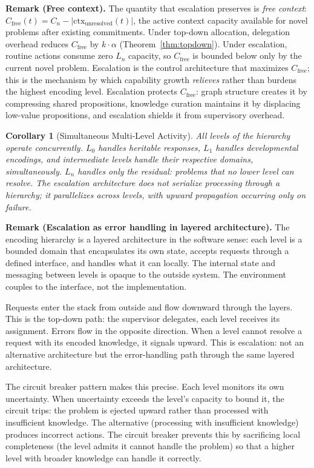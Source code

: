 \documentclass[11pt]{article}
\newtheorem{corollary}[theorem]{Corollary}
\theoremstyle{definition}
\begin{document}
\textbf{Remark (Free context).}
The quantity that escalation preserves is \emph{free context}:
$C_{\mathrm{free}}(t) = C_n -
|\mathrm{ctx}_{\mathrm{unresolved}}(t)|$, the active context capacity
available for novel problems after existing commitments. Under
top-down allocation, delegation overhead reduces
$C_{\mathrm{free}}$ by $k \cdot \alpha$
(Theorem~\ref{thm:topdown}). Under escalation, routine actions
consume zero $L_n$ capacity, so $C_{\mathrm{free}}$ is bounded below
only by the current novel problem. Escalation is the control
architecture that maximizes $C_{\mathrm{free}}$; this is the
mechanism by which capability growth \emph{relieves} rather than
burdens the highest encoding level. Escalation protects
$C_{\mathrm{free}}$: graph structure creates it by compressing
shared propositions, knowledge curation maintains it by displacing
low-value propositions, and escalation shields it from supervisory
overhead.

\begin{corollary}[Simultaneous Multi-Level Activity]
\label{cor:simultaneous}
All levels of the hierarchy operate concurrently. $L_0$ handles
heritable responses, $L_1$ handles developmental encodings, and
intermediate levels handle their respective domains,
simultaneously. $L_n$ handles only the residual: problems that no
lower level can resolve. The escalation architecture does not
serialize processing through a hierarchy; it parallelizes across levels,
with upward propagation occurring only on failure.
\end{corollary}

\textbf{Remark (Escalation as error handling in layered architecture).}
The encoding hierarchy is a layered architecture in the software sense:
each level is a bounded domain that encapsulates its own state, accepts
requests through a defined interface, and handles what it can locally.
The internal state and messaging between levels is opaque to the outside
system. The environment couples to the interface, not the
implementation.

Requests enter the stack from outside and flow downward through the
layers. This is the top-down path: the supervisor delegates, each level
receives its assignment. Errors flow in the opposite direction. When a
level cannot resolve a request with its encoded knowledge, it signals
upward. This is escalation: not an alternative architecture but the
error-handling path through the same layered architecture.

The circuit breaker pattern makes this precise. Each level monitors its
own uncertainty. When uncertainty exceeds the level's capacity to bound
it, the circuit trips: the problem is ejected upward rather than
processed with insufficient knowledge. The alternative (processing with
insufficient knowledge) produces incorrect actions. The circuit breaker
prevents this by sacrificing local completeness (the level admits it
cannot handle the problem) so that a higher level with broader
knowledge can handle it correctly.
\end{document}

